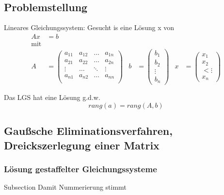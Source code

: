 \documentclass[
	ngerman,
	accentcolor=9c,%
	type=intern,
	marginpar=false
	]{tudapub}
\begin{document}
        \subsection{Problemstellung}
            Lineares Gleichungssystem: Gesucht is eine Lösung x von 
            \begin{align*}
                Ax &= b\\
                \text{mit}\\
                A &= 
                \begin{pmatrix}
                    a_{11} & a_{12} & \dots & a_{1n}\\
                    a_{21} & a_{22} & \dots & a_{2n}\\
                    \vdots & \dots & \ddots & \vdots\\
                    a_{n1} & a_{n2} & \dots & a_{nn}\\
                \end{pmatrix} &
                b &= 
                \begin{pmatrix}
                    b_1\\
                    b_2\\
                    \vdots\\
                    b_n
                \end{pmatrix} &
                x &= 
                \begin{pmatrix}
                    x_1\\
                    x_2\\<
                    \vdots\\
                    x_n
                \end{pmatrix}
            \end{align*}
            \begin{definition}
                Das LGS hat eine Lösung g.d.w.
                \begin{equation*}
                    rang(a) = rang(A,b)
                \end{equation*}
            \end{definition}
        \subsection{Gaußsche Eliminationsverfahren, Dreickszerlegung einer Matrix}
            \subsubsection{Lösung gestaffelter Gleichungssysteme}
                Subsection Damit Nummerierung stimmt
\end{document}
